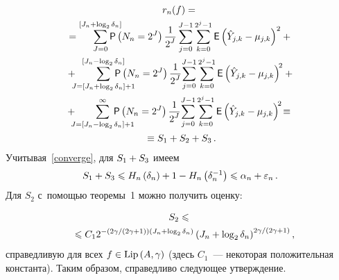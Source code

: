 \begin{multicols}{2}
\noindent
\begin{multline*}
r_n(f)={}\\
\!{}=\sum\limits_{J=0}^{[J_n+\log_2\delta_n]}\hspace*{-5mm}
{\sf P}\left(N_n=2^J\right)\fr{1}{2^J}\sum\limits_{j=0}^{J-1}\sumk\limits 
{\sf E}\left(\hat{Y}_{j,k}-\mujk\right)^2+{}\\
{}+\hspace*{-2.1mm}\sum\limits_{J=[J_n+\log_2\delta_n]+1}^{[J_n-\log_2\delta_n]}\hspace*{-8mm}
{\sf P}\left(N_n=2^J\right)\fr{1}{2^J}\!\sum\limits_{j=0}^{J-1}\sumk\limits 
{\sf E}\left(\hat{Y}_{j,k}-\mujk\right)^{\!2}+{}\\
+\hspace*{-2.1mm}\sum\limits_{J=[J_n-\log_2\delta_n]+1}^{\infty}\hspace*{-8.1mm}{\sf P}
\left(N_n=2^J\right)\fr{1}{2^J}\!\sum\limits_{j=0}^{J-1}\sumk\limits 
{\sf E}\left(\hat{Y}_{j,k}-\mujk\right)^{\!2}\!\equiv{}\hspace*{-0.3115pt}\\
{}\equiv S_1+S_2+S_3\,.
\end{multline*}
Учитывая~\eqref{converge}, для $S_1\hm+S_3$ имеем
\begin{equation*}
S_1+S_3\leqslant H_n\left(\delta_n\right)+1-H_n\left(\delta^{-1}_n\right)
\leqslant\alpha_n+\eps_n\,. %
\end{equation*}
Для $S_2$ с~помощью тео\-ре\-мы~1 можно получить \mbox{оценку}:

\noindent
\begin{multline*}
S_2\leqslant{}\\
\!{}\leqslant C_1 2^{-({2\gamma}/({2\gamma+1}))(J_n+\log_2\delta_n)}
\left(J_n+\log_2\delta_n\right)^{{2\gamma}/({2\gamma+1})},\hspace*{-7.95976pt}
\end{multline*} 
справедливую для всех $f\hm\in \mathrm{Lip}\,(A,\gamma)$ (здесь $C_1$~--- 
некоторая положительная константа). Таким образом, справедливо сле\-ду\-ющее утверж\-дение.


\end{multicols}
